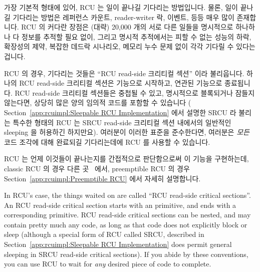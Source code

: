 가장 기본적 형태에 있어, RCU 는 일이 끝나길 기다리는 방법입니다.
물론, 일이 끝나길 기다리는 방법은 레퍼런스 카운트, reader-writer 락, 이벤트,
등등 매우 많이 존재합니다.
RCU 의 커다란 장점은 (대략) 20,000 개의 서로 다른 일들을 명시적으로 하나하나 다
정보를 추적할 필요 없이, 그리고 명시적 추적에서는 피할 수 없는 성능의 하락,
확장성의 제약, 복잡한 데드락 시나리오, 메모리 누수 문제 없이 각각 기다릴 수
있다는 겁니다.
\iffalse

In its most basic form, RCU is a way of waiting for things to finish.
Of course, there are a great many other ways of waiting for things to
finish, including reference counts, reader-writer locks, events, and so on.
The great advantage of RCU is that it can wait for each of
(say) 20,000 different things without having to explicitly
track each and every one of them, and without having to worry about
the performance degradation, scalability limitations, complex deadlock
scenarios, and memory-leak hazards that are inherent in schemes
using explicit tracking.
\fi

RCU 의 경우, 기다리는 것들은 ``RCU read-side 크리티컬 섹션'' 이라 불리웁니다.
하나의 RCU read-side 크리티컬 섹션은  기능으로 시작하고,
연관된  기능으로 종료됩니다.
RCU read-side 크리티컬 섹션들은 중첩될 수 있고, 명시적으로 블록되거나 잠들지
않는다면, 상당히 많은 양의 임의적 코드를 포함할 수 있습니다 (
Section~\ref{app:rcuimpl:Sleepable RCU Implementation} 에서 설명한 SRCU 라
불리는 특수한 형태의 RCU 는 SRCU read-side 크리티컬 섹션 내에서의 일반적인
sleeping 을 허용하긴 하지만요).
여러분이 이러한 표준을 준수한다면, 여러분은 \emph{모든} 코드 조각에 대해
완료되길 기다리는데에 RCU 를 사용할 수 있습니다.

RCU 는 언제 이것들이 끝나는지를 간접적으로 판단함으로써 이 기능을 구현하는데,
classic RCU 의 경우 다른 곳~\cite{McKenney98} 에서, preemptible RCU 의 경우
Section~\ref{app:rcuimpl:Preemptible RCU} 에서 자세히 설명합니다.
\iffalse

In RCU's case, the things waited on are called
``RCU read-side critical sections''.
An RCU read-side critical section starts with an
 primitive, and ends with a corresponding
 primitive.
RCU read-side critical sections can be nested, and may contain pretty
much any code, as long as that code does not explicitly block or sleep
(although a special form of RCU called SRCU, described in
Section~\ref{app:rcuimpl:Sleepable RCU Implementation}
does permit general sleeping in SRCU read-side critical sections).
If you abide by these conventions, you can use RCU to wait for \emph{any}
desired piece of code to complete.

